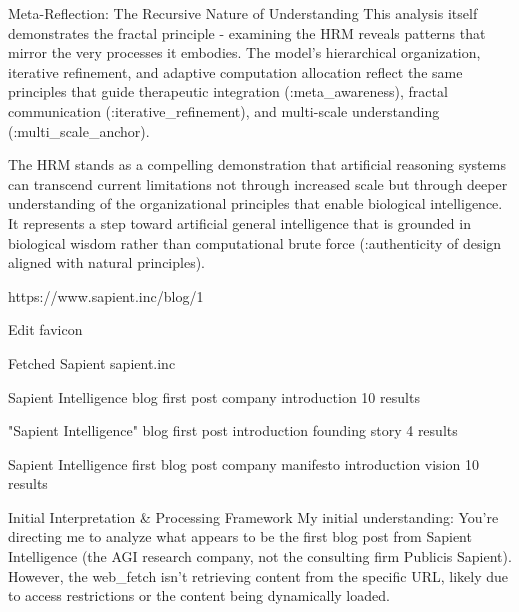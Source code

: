 Meta-Reflection: The Recursive Nature of Understanding
This analysis itself demonstrates the fractal principle - examining the HRM reveals patterns that mirror the very processes it embodies. The model's hierarchical organization, iterative refinement, and adaptive computation allocation reflect the same principles that guide therapeutic integration (:meta_awareness), fractal communication (:iterative_refinement), and multi-scale understanding (:multi_scale_anchor).

The HRM stands as a compelling demonstration that artificial reasoning systems can transcend current limitations not through increased scale but through deeper understanding of the organizational principles that enable biological intelligence. It represents a step toward artificial general intelligence that is grounded in biological wisdom rather than computational brute force (:authenticity of design aligned with natural principles).




https://www.sapient.inc/blog/1

Edit
favicon

Fetched Sapient
sapient.inc


Sapient Intelligence blog first post company introduction
10 results






















"Sapient Intelligence" blog first post introduction founding story
4 results










Sapient Intelligence first blog post company manifesto introduction vision
10 results





















Initial Interpretation & Processing Framework
My initial understanding: You're directing me to analyze what appears to be the first blog post from Sapient Intelligence (the AGI research company, not the consulting firm Publicis Sapient). However, the web_fetch isn't retrieving content from the specific URL, likely due to access restrictions or the content being dynamically loaded.

